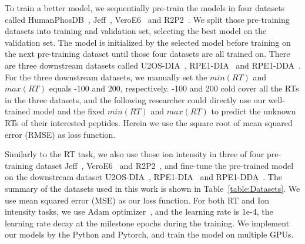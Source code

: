 
To train a better model, we sequentially pre-train the models in four datasets called 
HumanPhosDB~\cite{lawrence2016plug}, Jeff~\cite{liu2018vivo}, VeroE6~\cite{bouhaddou2020global}
and R2P2~\cite{leutert2019r2}. We split those pre-training datasets into training and validation set, selecting the best model on the validation set. The model is initialized by the selected model before training on the next pre-training dataset until those four datasets are all trained on. There are three downstream datasets called U2OS-DIA~\cite{wang2020naguider}, RPE1-DIA~\cite{bekker2020rapid} and RPE1-DDA~\cite{bekker2020rapid}. For the three downstream datasets, we manually set the $min(RT)$ and $max(RT)$ equals -100 and 200, respectively. -100 and 200 cold cover all the RTs in the three datasets, and the following researcher could directly use our well-trained model and the fixed $min(RT)$ and $max(RT)$ to predict the unknown RTs of their interested peptides.
Herein we use the square root of mean squared error (RMSE) as loss function.


Similarly to the RT task, we also use those ion intensity in three of four pre-training dataset Jeff~\cite{liu2018vivo}, VeroE6~\cite{bouhaddou2020global} and R2P2~\cite{leutert2019r2}, and fine-tune the pre-trained model on the downstream dataset U2OS-DIA~\cite{wang2020naguider}, RPE1-DIA~\cite{bekker2020rapid} and RPE1-DDA~\cite{bekker2020rapid}. The summary of the datasets used in this work is shown in Table~\ref{table:Datasets}.
We use mean squared
error (MSE) as our loss function. For both RT and Ion intensity tasks, we use Adam optimizer~\cite{kingma2017adam}, and the learning rate is 1e-4, the learning rate decay at the milestone epochs during the training. We implement our models by the Python and Pytorch, and train the model on multiple GPUs. 
